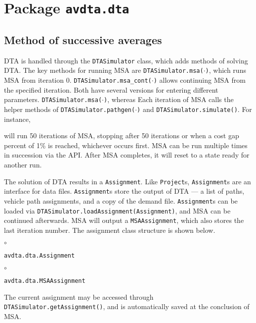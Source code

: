\chapter{Package \texttt{avdta.dta}}


\section{Method of successive averages}

DTA is handled through the \texttt{DTASimulator} class, which adds methods of solving DTA. The key methods for running MSA are \texttt{DTASimulator.msa($\cdot$)}, which runs MSA from iteration 0.  \texttt{DTASimulator.msa\_cont($\cdot$)} allows continuing MSA from the specified iteration. Both have several versions for entering different parameters. \texttt{DTASimulator.msa($\cdot$)}, whereas  Each iteration of MSA calls the helper methods of \texttt{DTASimulator.pathgen($\cdot$)} and \texttt{DTASimulator.simulate()}. For instance,
\begin{algorithmic}[1]
\end{algorithmic}
will run 50 iterations of MSA, stopping after 50 iterations or when a cost gap percent of 1\% is reached, whichever occurs first. MSA can be run multiple times in succession via the API. After MSA completes, it will reset to a state ready for another run.

The solution of DTA results in a \texttt{Assignment}. Like \texttt{Project}s, \texttt{Assignment}s are an interface for data files. \texttt{Assignment}s store the output of DTA --- a list of paths, vehicle path assignments, and a copy of the demand file. \texttt{Assignment}s can be loaded via \texttt{DTASimulator.loadAssignment(Assignment)}, and MSA can be continued afterwards. MSA will output a \texttt{MSAAssignment}, which also stores the last iteration number. The assignment class structure is shown below.
\begin{list}{$\circ$}{}
	\item \texttt{avdta.dta.Assignment}
	
	\begin{list}{$\circ$}{}
		\item \texttt{avdta.dta.MSAAssignment}
	\end{list}
\end{list}
The current assignment may be accessed through \texttt{DTASimulator.getAssignment()}, and is automatically saved at the conclusion of MSA.

